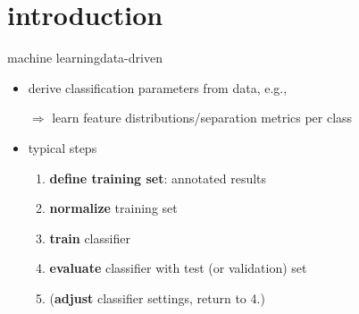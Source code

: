     \section[intro]{introduction}
        \begin{frame}{machine learning}{data-driven}
           \begin{itemize}
                \item   derive classification parameters from data, e.g.,
                \item[$\Rightarrow$]  learn feature distributions/separation metrics per class
                \bigskip
                \item  typical steps
                    \begin{enumerate}
                        \item	\textbf{define training set}: annotated results
                        \smallskip
                        \item<2->	\textbf{normalize} training set
                        \smallskip
                        \item<3->	\textbf{train} classifier
                        \smallskip
                        \item<4->	\textbf{evaluate} classifier with test (or validation) set
                        \smallskip
                        \item<5->	(\textbf{adjust} classifier settings, return to 4.)
                    \end{enumerate}
            \end{itemize}
        \end{frame}

